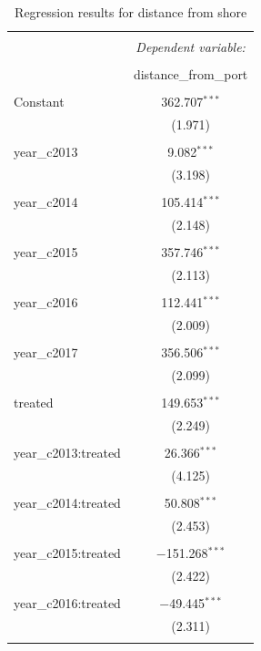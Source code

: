 \documentclass[11pt,english]{article}
\begin{document}
\begin{table}[!htbp] \centering 
  \caption{\label{tab:dist_port}Regression results for distance from shore} 
  \label{} 
\begin{tabular}{@{\extracolsep{5pt}}lc} 
\\[-1.8ex]\hline 
\hline \\[-1.8ex] 
 & \multicolumn{1}{c}{\textit{Dependent variable:}} \\ 
\cline{2-2} 
\\[-1.8ex] & distance\_from\_port \\ 
\hline \\[-1.8ex] 
 Constant & 362.707$^{***}$ \\ 
  & (1.971) \\ 
  & \\ 
 year\_c2013 & 9.082$^{***}$ \\ 
  & (3.198) \\ 
  & \\ 
 year\_c2014 & 105.414$^{***}$ \\ 
  & (2.148) \\ 
  & \\ 
 year\_c2015 & 357.746$^{***}$ \\ 
  & (2.113) \\ 
  & \\ 
 year\_c2016 & 112.441$^{***}$ \\ 
  & (2.009) \\ 
  & \\ 
 year\_c2017 & 356.506$^{***}$ \\ 
  & (2.099) \\ 
  & \\ 
 treated & 149.653$^{***}$ \\ 
  & (2.249) \\ 
  & \\ 
 year\_c2013:treated & 26.366$^{***}$ \\ 
  & (4.125) \\ 
  & \\ 
 year\_c2014:treated & 50.808$^{***}$ \\ 
  & (2.453) \\ 
  & \\ 
 year\_c2015:treated & $-$151.268$^{***}$ \\ 
  & (2.422) \\ 
  & \\ 
 year\_c2016:treated & $-$49.445$^{***}$ \\ 
  & (2.311) \\ 
  & \\ 

\end{tabular}
\end{table}
\end{document}
